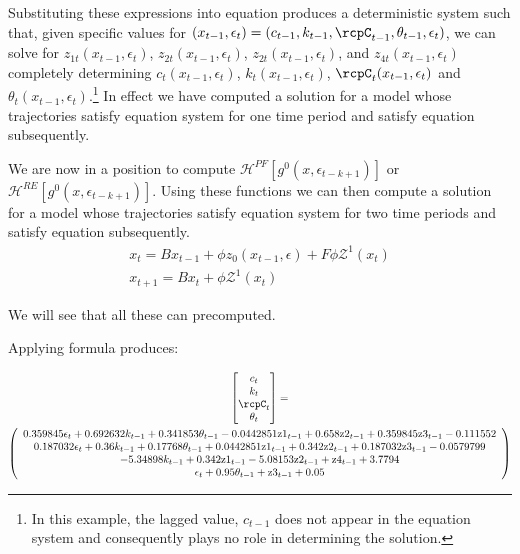 \documentclass[12pt]{article}
\begin{document}
Substituting  these expressions into equation  produces
a deterministic system such that, given specific values for 
$(x_{t-1},\epsilon_{t})=(c_{t-1}, k_{t-1},\rcpC_{t-1}, \theta_{t-1}, \epsilon_t)$, we can solve for $z_{1t}(x_{t-1},\epsilon_{t})$, $z_{2t}(x_{t-1},\epsilon_{t})$, $z_{2t}(x_{t-1},\epsilon_{t})$, and $z_{4t}(x_{t-1},\epsilon_{t})$  completely determining
$c_{t}(x_{t-1},\epsilon_{t})$, $k_{t}(x_{t-1},\epsilon_{t})$, $\rcpC_{t}(x_{t-1},\epsilon_{t})$  and $\theta_{t}(x_{t-1},\epsilon_{t})$.\footnote{In this example, the lagged value,  $c_{t-1}$ does not appear in the equation system and consequently plays no role in determining the solution.}  In effect we have 
computed a solution for a model whose trajectories satisfy equation system 
for one time period and satisfy equation  subsequently.

We are now in a position to compute
$\mathcal{H}^{PF}[g^{0}(x,\epsilon_{t-k+1})]$ or
$\mathcal{H}^{RE}[g^{0}(x,\epsilon_{t-k+1})]$.
Using these functions we can then compute a solution for a model whose trajectories satisfy equation system 
for two time periods and satisfy equation  subsequently.
\begin{gather}
  \label{eq:1}
  x_t=B x_{t-1} + \phi z_0(x_{t-1},\epsilon) + F \phi \mathcal{Z}^1(x_t)\\
  x_{t+1}=B x_{t} + \phi \mathcal{Z}^1(x_t)
\end{gather}

We will see that all these can precomputed.

Applying formula  produces:

{\tiny
\begin{gather}
  \begin{bmatrix}
c_t\\k_t\\ \rcpC_t\\\theta_t
  \end{bmatrix}=\\%
   \left(
   \begin{array}{c}
 0.359845 \epsilon _t+0.692632 k_{t-1}+0.341853 \theta _{t-1}-0.0442851
   \text{z1}_{t-1}+0.658 \text{z2}_{t-1}+0.359845 \text{z3}_{t-1}-0.111552 \\
 0.187032 \epsilon _t+0.36 k_{t-1}+0.17768 \theta _{t-1}+0.0442851
   \text{z1}_{t-1}+0.342 \text{z2}_{t-1}+0.187032 \text{z3}_{t-1}-0.0579799 \\
 -5.34898 k_{t-1}+0.342 \text{z1}_{t-1}-5.08153
   \text{z2}_{t-1}+\text{z4}_{t-1}+3.7794 \\
 \epsilon _t+0.95 \theta _{t-1}+\text{z3}_{t-1}+0.05 \\
   \end{array}
   \right)
\end{gather}
}
\end{document}
